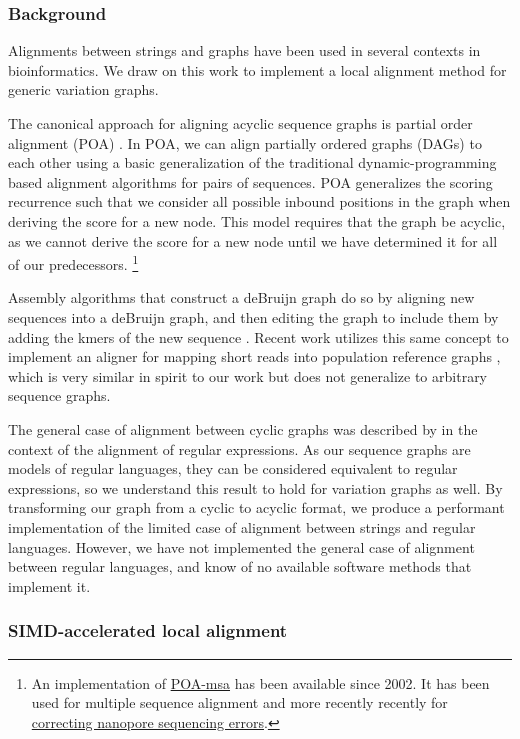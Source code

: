 \documentclass[12pt]{article}
\begin{document}
\subsubsection{Background}

Alignments between strings and graphs have been used in several contexts in bioinformatics.
We draw on this work to implement a local alignment method for generic variation graphs.

The canonical approach for aligning acyclic sequence graphs is partial order alignment (POA) \cite{lee2002POA}.
In POA, we can align partially ordered graphs (DAGs) to each other using a basic generalization of the traditional dynamic-programming based alignment algorithms for pairs of sequences.
POA generalizes the scoring recurrence such that we consider all possible inbound positions in the graph when deriving the score for a new node.
This model requires that the graph be acyclic, as we cannot derive the score for a new node until we have determined it for all of our predecessors.
\footnote{An implementation of \href{https://sourceforge.net/projects/poamsa/}{POA-msa} has been available since 2002. It has been used for multiple sequence alignment and more recently recently for \href{https://simpsonlab.github.io/2015/03/30/optimizing-hmm/}{correcting nanopore sequencing errors}.}

Assembly algorithms that construct a deBruijn graph do so by aligning new sequences into a deBruijn graph, and then editing the graph to include them by adding the kmers of the new sequence \cite{iqbal2013, zerbino2008}.
Recent work utilizes this same concept to implement an aligner for mapping short reads into population reference graphs \cite{prg2015}, which is very similar in spirit to our work but does not generalize to arbitrary sequence graphs.

The general case of alignment between cyclic graphs was described by \cite{myers1989} in the context of the alignment of regular expressions.
As our sequence graphs are models of regular languages, they can be considered equivalent to regular expressions, so we understand this result to hold for variation graphs as well.
By transforming our graph from a cyclic to acyclic format, we produce a performant implementation of the limited case of alignment between strings and regular languages. However, we have not implemented the general case of alignment between regular languages, and know of no available software methods that implement it.

\subsubsection{SIMD-accelerated local alignment}
\end{document}
